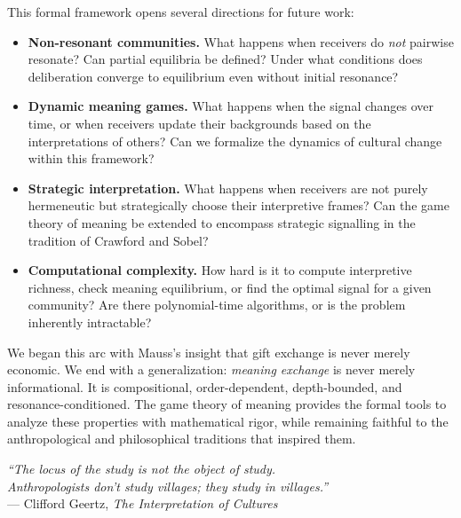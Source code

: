 This formal framework opens several directions for future work:

\begin{itemize}
  \item \textbf{Non-resonant communities.}  What happens when receivers
    do \emph{not} pairwise resonate?  Can partial equilibria be defined?
    Under what conditions does deliberation converge to equilibrium even
    without initial resonance?

  \item \textbf{Dynamic meaning games.}  What happens when the signal
    changes over time, or when receivers update their backgrounds based on
    the interpretations of others?  Can we formalize the dynamics of
    cultural change within this framework?

  \item \textbf{Strategic interpretation.}  What happens when receivers
    are not purely hermeneutic but strategically choose their interpretive
    frames?  Can the game theory of meaning be extended to encompass
    strategic signalling in the tradition of Crawford and Sobel?

  \item \textbf{Computational complexity.}  How hard is it to compute
    interpretive richness, check meaning equilibrium, or find the optimal
    signal for a given community?  Are there polynomial-time algorithms,
    or is the problem inherently intractable?
\end{itemize}

We began this arc with Mauss's insight that gift exchange is never merely
economic.  We end with a generalization: \emph{meaning exchange} is never
merely informational.  It is compositional, order-dependent, depth-bounded,
and resonance-conditioned.  The game theory of meaning provides the formal
tools to analyze these properties with mathematical rigor, while remaining
faithful to the anthropological and philosophical traditions that inspired
them.

\bigskip

\begin{center}
\textit{``The locus of the study is not the object of study.\\
Anthropologists don't study villages; they study in villages.''}\\
--- Clifford Geertz, \textit{The Interpretation of Cultures}
\end{center}
